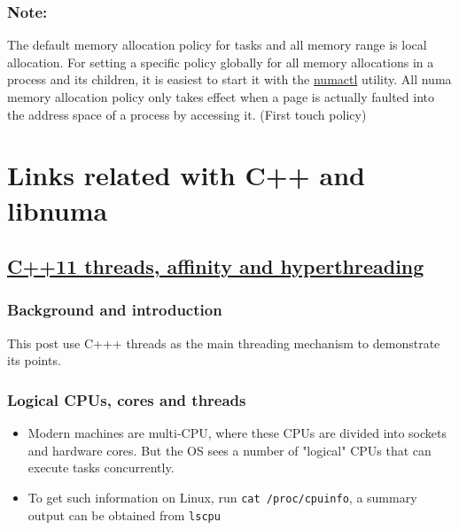 \documentclass[11pt]{article}
\begin{document}
\subsubsection{Note:}
\label{sec-6-1-2}
The default memory allocation policy for tasks and all memory range is local allocation.
For setting a specific policy globally for all memory allocations in a process and its children, it is easiest to start it with the \href{http://man7.org/linux/man-pages/man8/numactl.8.html}{numactl} utility.
All numa memory allocation policy only takes effect when a page is actually faulted into the address space of a process by accessing it. (First touch policy)

\section{Links related with C++ and libnuma}
\label{sec-7}
\subsection{\href{https://eli.thegreenplace.net/2016/c11-threads-affinity-and-hyperthreading/}{C++11 threads, affinity and hyperthreading}}
\label{sec-7-1}
\subsubsection{Background and introduction}
\label{sec-7-1-1}
This post use C+++ threads as the main threading mechanism to demonstrate its points.
\subsubsection{Logical CPUs, cores and threads}
\label{sec-7-1-2}
\begin{itemize}
\item Modern machines are multi-CPU, where these CPUs are divided into sockets and hardware cores. But the OS sees a number of "logical" CPUs that can execute tasks concurrently.
\item To get such information on Linux, run \verb~cat /proc/cpuinfo~, a summary output can be obtained from \verb~lscpu~
\end{itemize}
\end{document}
